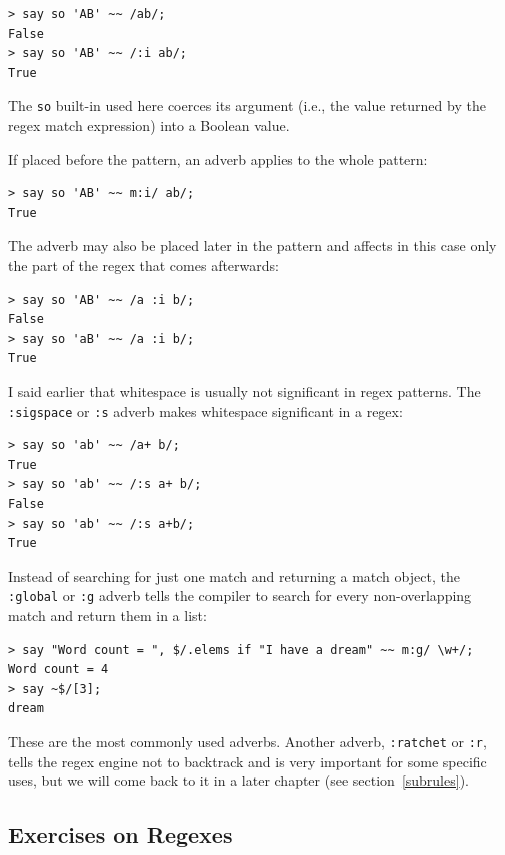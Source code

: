 \begin{verbatim}
> say so 'AB' ~~ /ab/;
False
> say so 'AB' ~~ /:i ab/;
True
\end{verbatim}
%

The \verb'so' built-in used here coerces its argument (i.e., 
the value returned by the regex match expression) into 
a Boolean value. 

If placed before the pattern, an adverb applies to the 
whole pattern:

\begin{verbatim}
> say so 'AB' ~~ m:i/ ab/;
True
\end{verbatim}
%

The adverb may also be placed later in the pattern and affects 
in this case only the part of the regex that comes afterwards:

\begin{verbatim}
> say so 'AB' ~~ /a :i b/;
False
> say so 'aB' ~~ /a :i b/;
True
\end{verbatim}
%

I said earlier that whitespace is usually not significant 
in regex patterns. The \verb':sigspace' or \verb':s' adverb 
makes whitespace significant in a regex:

\begin{verbatim}
> say so 'ab' ~~ /a+ b/;
True
> say so 'ab' ~~ /:s a+ b/;
False
> say so 'ab' ~~ /:s a+b/;
True
\end{verbatim}
%

Instead of searching for just one match and returning a 
match object, the \verb':global' or \verb':g' adverb tells
the compiler to search for every non-overlapping match 
and return them in a list:

\begin{verbatim}
> say "Word count = ", $/.elems if "I have a dream" ~~ m:g/ \w+/;
Word count = 4
> say ~$/[3];
dream
\end{verbatim}
%

These are the most commonly used adverbs. Another adverb, 
\verb':ratchet' or \verb':r', tells the regex engine 
not to backtrack and is very important for some specific 
uses, but we will come back to it in a later chapter (see 
section~\ref{subrules}).

\subsection{Exercises on Regexes}
\label{regex_exercises}


